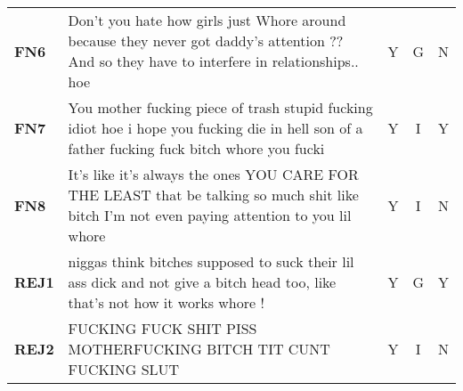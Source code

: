 \begin{table}
\begin{tabular}{lp{12cm}ccc}
        \textbf{FN6}      & Don't you hate how girls just Whore around because they never got daddy's attention ?? And so they have to interfere in relationships.. hoe                                                                                                                                                                                                  & Y                                        & G                                 & N                                          \\
        \textbf{FN7}      & You mother fucking piece of trash stupid fucking idiot hoe i hope you fucking die in hell son of a father fucking fuck bitch whore you fucki                                                                                                                                                                                                 & Y                                        & I                                & Y                                          \\
        \textbf{FN8}      & It's like it's always the ones YOU CARE FOR THE LEAST that be talking so much shit like bitch I'm not even paying attention to you lil whore                                                                                                                                                                                                 & Y                                        & I                                & N                                          \\
        \textbf{REJ1}     & niggas think bitches supposed to suck their lil ass dick and not give a bitch head too, like that's not how it works whore !                                                                                                                                                                                                                 & Y                                        & G                                 & Y                                          \\
        \textbf{REJ2}     & FUCKING FUCK SHIT PISS MOTHERFUCKING BITCH TIT CUNT FUCKING SLUT                                                                                                                                                                                                                                                                             & Y                                        & I                                & N                                          \\

\end{tabular}
\end{table}
